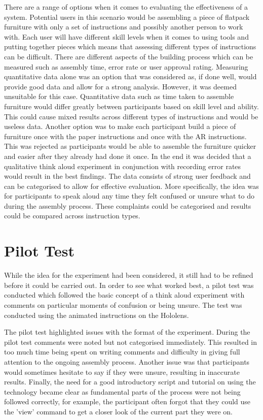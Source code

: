 \documentclass{l4proj}
\begin{document}
There are a range of options when it comes to evaluating the effectiveness of a system. Potential users in this scenario would be assembling a piece of flatpack furniture with only a set of instructions and possibly another person to work with. Each user will have different skill levels when it comes to using tools and putting together pieces which means that assessing different types of instructions can be difficult. There are different aspects of the building process which can be measured such as assembly time, error rate or user approval rating. Measuring quantitative data alone was an option that was considered as, if done well, would provide good data and allow for a strong analysis. However, it was deemed unsuitable for this case. Quantitative data such as time taken to assemble furniture would differ greatly between participants based on skill level and ability. This could cause mixed results across different types of instructions and would be useless data. Another option was to make each participant build a piece of furniture once with the paper instructions and once with the AR instructions. This was rejected as participants would be able to assemble the furniture quicker and easier after they already had done it once. In the end it was decided that a qualitative think aloud experiment in conjunction with recording error rates would result in the best findings. The data consists of strong user feedback and can be categorised to allow for effective evaluation. More specifically, the idea was for participants to speak aloud any time they felt confused or unsure what to do during the assembly process. These complaints could be categorised and results could be compared across instruction types.

\section{Pilot Test}

While the idea for the experiment had been considered, it still had to be refined before it could be carried out. In order to see what worked best, a pilot test was conducted which followed the basic concept of a think aloud experiment with comments on particular moments of confusion or being unsure. The test was conducted using the animated instructions on the Hololens.

The pilot test highlighted issues with the format of the experiment. During the pilot test comments were noted but not categorised immediately. This resulted in too much time being spent on writing comments and difficulty in giving full attention to the ongoing assembly process. Another issue was that participants would sometimes hesitate to say if they were unsure, resulting in inaccurate results. Finally, the need for a good introductory script and tutorial on using the technology became clear as fundamental parts of the process were not being followed correctly, for example, the participant often forgot that they could use the 'view' command to get a closer look of the current part they were on.
\end{document}
